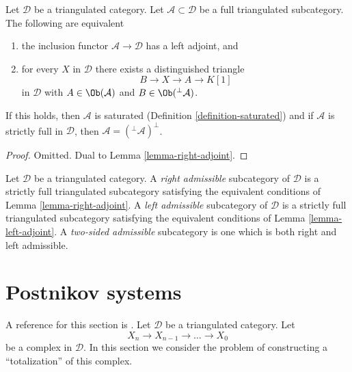 \begin{lemma}
\label{lemma-left-adjoint}
Let $\mathcal{D}$ be a triangulated category. Let
$\mathcal{A} \subset \mathcal{D}$ be a full triangulated subcategory.
The following are equivalent
\begin{enumerate}
\item the inclusion functor $\mathcal{A} \to \mathcal{D}$
has a left adjoint, and
\item for every $X$ in $\mathcal{D}$ there exists a distinguished
triangle
$$
B \to X \to A \to K[1]
$$
in $\mathcal{D}$ with $A \in \Ob(\mathcal{A})$ and
$B \in \Ob({}^\perp\mathcal{A})$.
\end{enumerate}
If this holds, then $\mathcal{A}$ is saturated
(Definition \ref{definition-saturated}) and if $\mathcal{A}$
is strictly full in $\mathcal{D}$, then
$\mathcal{A} = ({}^\perp\mathcal{A})^\perp$.
\end{lemma}

\begin{proof}
Omitted. Dual to Lemma \ref{lemma-right-adjoint}.
\end{proof}

\begin{definition}
\label{definition-admissible}
Let $\mathcal{D}$ be a triangulated category. A {\it right admissible}
subcategory of $\mathcal{D}$ is a strictly full triangulated subcategory
satisfying the equivalent conditions of Lemma \ref{lemma-right-adjoint}.
A {\it left admissible}
subcategory of $\mathcal{D}$ is a strictly full triangulated subcategory
satisfying the equivalent conditions of Lemma \ref{lemma-left-adjoint}.
A {\it two-sided admissible} subcategory is one which is both
right and left admissible.
\end{definition}






\section{Postnikov systems}
\label{section-postnikov}

\noindent
A reference for this section is \cite{Orlov-K3}. Let $\mathcal{D}$
be a triangulated category. Let
$$
X_n \to X_{n - 1} \to \ldots \to X_0
$$
be a complex in $\mathcal{D}$. In this section we consider the problem
of constructing a ``totalization'' of this complex.

